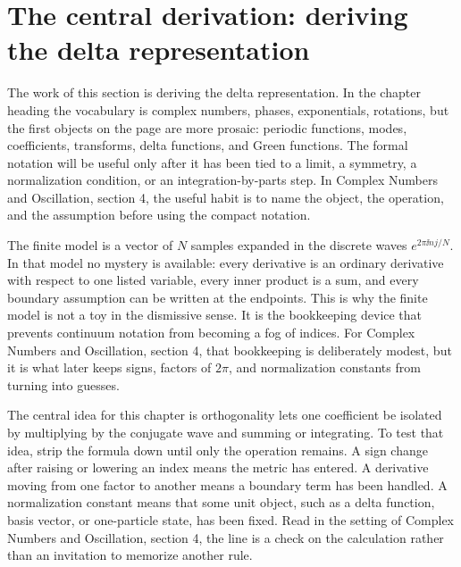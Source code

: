 \section{The central derivation: deriving the delta representation}













The work of this section is deriving the delta representation.  In the chapter heading the vocabulary is complex numbers, phases, exponentials, rotations, but the first objects on the page are more prosaic: periodic functions, modes, coefficients, transforms, delta functions, and Green functions.  The formal notation will be useful only after it has been tied to a limit, a symmetry, a normalization condition, or an integration-by-parts step.  In Complex Numbers and Oscillation, section 4, the useful habit is to name the object, the operation, and the assumption before using the compact notation.

The finite model is a vector of \(N\) samples expanded in the discrete waves \(e^{2\pi \ii nj/N}\).  In that model no mystery is available: every derivative is an ordinary derivative with respect to one listed variable, every inner product is a sum, and every boundary assumption can be written at the endpoints.  This is why the finite model is not a toy in the dismissive sense.  It is the bookkeeping device that prevents continuum notation from becoming a fog of indices.  For Complex Numbers and Oscillation, section 4, that bookkeeping is deliberately modest, but it is what later keeps signs, factors of \(2\pi\), and normalization constants from turning into guesses.

The central idea for this chapter is orthogonality lets one coefficient be isolated by multiplying by the conjugate wave and summing or integrating.  To test that idea, strip the formula down until only the operation remains.  A sign change after raising or lowering an index means the metric has entered.  A derivative moving from one factor to another means a boundary term has been handled.  A normalization constant means that some unit object, such as a delta function, basis vector, or one-particle state, has been fixed.  Read in the setting of Complex Numbers and Oscillation, section 4, the line is a check on the calculation rather than an invitation to memorize another rule.

